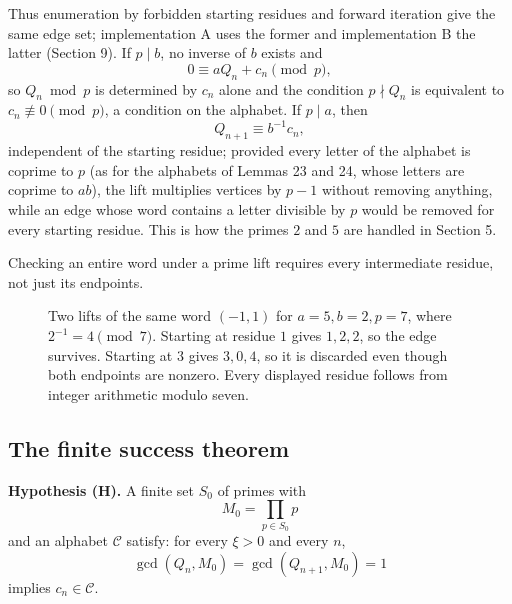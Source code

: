 \documentclass[11pt,reqno]{amsart}
\theoremstyle{definition}
\theoremstyle{remark}
\begin{document}
Thus enumeration by forbidden starting residues and forward iteration give
the same edge set; implementation A uses the former and implementation B
the latter (Section 9). If \(p\mid b\), no inverse of \(b\) exists and
\[
0\equiv aQ_n+c_n\pmod p,
\]
so \(Q_n\bmod p\) is determined by
\(c_n\) alone and the condition \(p\nmid Q_n\) is equivalent to
\(c_n\not\equiv0\pmod p\), a condition on the alphabet. If \(p\mid a\),
then
\[
Q_{n+1}\equiv b^{-1}c_n,
\]
independent of the starting residue;
provided every letter of the alphabet is coprime to \(p\) (as for the
alphabets of Lemmas 23 and 24, whose letters are coprime to \(ab\)),
the lift multiplies vertices by \(p-1\) without removing anything, while
an edge whose word contains a letter divisible by \(p\) would be removed
for every starting residue.
This is how the primes \(2\) and \(5\) are handled in Section 5.

Checking an entire word under a prime lift requires every intermediate residue, not just its endpoints.

\begin{figure}[htbp]
\centering

\caption{Two lifts of the same word \((-1,1)\) for \(a=5,b=2,p=7\), where \(2^{-1}=4\pmod7\). Starting at residue \(1\) gives \(1,2,2\), so the edge survives. Starting at \(3\) gives \(3,0,4\), so it is discarded even though both endpoints are nonzero. Every displayed residue follows from integer arithmetic modulo seven.}
\label{fig:prime-lift}
\end{figure}

\subsection{The finite success theorem}\label{sec:4.5}

\textbf{Hypothesis (H).} A finite set \(S_0\) of primes with
\[
M_0=\prod_{p\in S_0}p
\]
and an alphabet \(\mathcal C\) satisfy: for
every \(\xi>0\) and every \(n\),
\[
\gcd(Q_n,M_0)=\gcd(Q_{n+1},M_0)=1
\]
implies \(c_n\in\mathcal C\).
\end{document}
